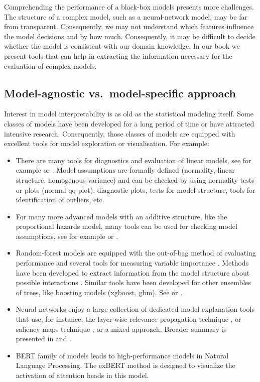 \documentclass[12pt,]{krantz}
\providecommand{\tightlist}{%
  \setlength{\itemsep}{0pt}\setlength{\parskip}{0pt}}
\begin{document}
Comprehending the performance of a black-box models presents more challenges. The structure of a complex model, such as a neural-network model, may be far from transparent. Consequently, we may not understand which features influence the model decisions and by how much. Consequently, it may be difficult to decide whether the model is consistent with our domain knowledge. In our book we present tools that can help in extracting the information necessary for the evaluation of complex models.

\hypertarget{model-agnostic-vs.model-specific-approach}{%
\subsection{Model-agnostic vs.~model-specific approach}\label{model-agnostic-vs.model-specific-approach}}

Interest in model interpretability is as old as the statistical modeling itself.
Some classes of models have been developed for a long period of time or have attracted intensive research. Consequently, those classes of models are equipped with excellent tools for model exploration or visualisation. For example:

\begin{itemize}
\tightlist
\item
  There are many tools for diagnostics and evaluation of linear models, see for example \citep{Galecki2013} or \citep{Faraway02practicalregression}. Model assumptions are formally defined (normality, linear structure, homogenous variance) and can be checked by using normality tests or plots (normal qq-plot), diagnostic plots, tests for model structure, tools for identification of outliers, etc.
\item
  For many more advanced models with an additive structure, like the proportional hazards model, many tools can be used for checking model assumptions, see for example \citep{rms} or \citep{sheather2009modern}.
\item
  Random-forest models are equipped with the out-of-bag method of evaluating performance and several tools for measuring variable importance \citep{R-randomForest}. Methods have been developed to extract information from the model structure about possible interactions \citep{randomForestExplainer}. Similar tools have been developed for other ensembles of trees, like boosting models (xgboost, gbm). See \citep{xgboostExplainer} or \citep{EIXkarbowiak}.
\item
  Neural networks enjoy a large collection of dedicated model-explanation tools that use, for instance, the layer-wise relevance propagation technique \citep{BachLWRP}, or saliency maps technique \citep{SaliencyMaps}, or a mixed approach. Broader summary is presented in \citep{samek2017explainable} and \citep{alber2018innvestigate}.
\item
  BERT family of models leads to high-performance models in Natural Language Processing. The exBERT method \citep{hoover2019exbert} is designed to visualize the activation of attention heads in this model.
\end{itemize}
\end{document}

